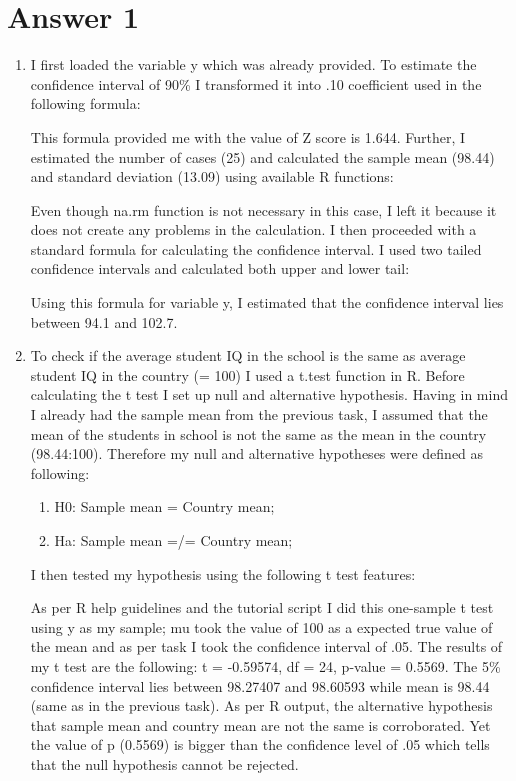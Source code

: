\documentclass[12pt,letterpaper]{article}
\begin{document}
\vspace{1cm}
\section*{Answer 1}

\begin{enumerate}
	\item I first loaded the variable y which was already provided. To estimate the confidence interval of 90\% I transformed it into .10 coefficient used in the following formula:
 
	This formula provided me with the value of Z score is 1.644. Further, I estimated the number of cases (25) and calculated the sample mean (98.44) and standard deviation (13.09) using available R functions:
	
	Even though na.rm function is not necessary in this case, I left it because it does not create any problems in the calculation. I then proceeded with a standard formula for calculating the confidence interval. I used two tailed confidence intervals and calculated both upper and lower tail: 

	Using this formula for variable y, I estimated that the confidence interval lies between 94.1 and 102.7.	
	
	\item To check if the average student IQ in the school is the same as average student IQ in the country (= 100) I used a t.test function in R. Before calculating the t test I set up null and alternative hypothesis. Having in mind I already had the sample mean from the previous task, I assumed that the mean of the students in school is not the same as the mean in the country (98.44:100). Therefore my null and alternative hypotheses were defined as following:
	\begin{enumerate}
		\item H0: Sample mean = Country mean;
		\item Ha: Sample mean =/= Country mean;
	\end{enumerate} 
I then tested my hypothesis using the following t test features:
	
As per R help guidelines and the tutorial script I did this one-sample t test using y as my sample; mu took the value of 100 as a expected true value of the mean and as per task I took the confidence interval of .05. The results of my t test are the following: t = -0.59574, df = 24, p-value = 0.5569. The 5\% confidence interval lies between 98.27407 and 98.60593 while mean is 98.44 (same as in the previous task). As per R output, the alternative hypothesis that sample mean and country mean are not the same is corroborated. Yet the value of p (0.5569) is bigger than the confidence level of .05 which tells that the null hypothesis cannot be rejected.  
\end{enumerate}
\end{document}
